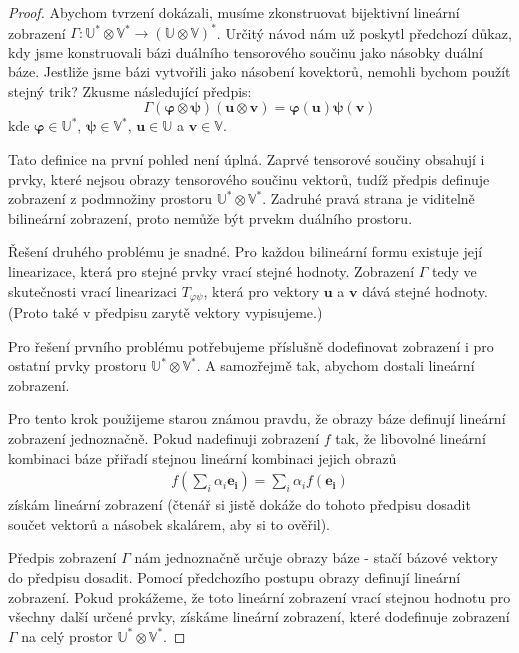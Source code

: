 \documentclass[a5paper,12pt]{amsbook}
\theoremstyle{definition}
\newcommand{\myvec}[1]{\bm{#1}}
\newcommand{\myspace}[1]{\mathbb{#1}}
\begin{document}
\begin{proof}
Abychom tvrzení dokázali, musíme zkonstruovat bijektivní lineární zobrazení
$\Gamma: \myspace{U^*}\otimes\myspace{V^*}\rightarrow(\myspace{U}\otimes\myspace{V})^*$. Určitý
návod nám už poskytl předchozí důkaz, kdy jsme konstruovali bázi duálního tensorového součinu
jako násobky duální báze. Jestliže jsme bázi vytvořili jako násobení kovektorů, nemohli bychom
použít stejný trik? Zkusme následující předpis:
\begin{equation*}
\Gamma(\myvec{\varphi}\otimes\myvec{\psi})(\myvec{u}\otimes\myvec{v}) 
  = \myvec{\varphi}(\myvec{u})\myvec{\psi}(\myvec{v})
\end{equation*}
kde $\myvec{\varphi}\in\myspace{U^*}$, $\myvec{\psi}\in\myspace{V^*}$, $\myvec{u}\in\myspace{U}$
a $\myvec{v}\in\myspace{V}$.

Tato definice na první pohled není úplná. Zaprvé tensorové součiny obsahují i prvky,
které nejsou obrazy tensorového součinu vektorů, tudíž předpis definuje zobrazení z podmnožiny
prostoru $\myspace{U^*}\otimes\myspace{V^*}$. Zadruhé pravá strana je viditelně bilineární
zobrazení, proto nemůže být prvekm duálního prostoru.

Řešení druhého problému je snadné. Pro každou bilineární formu existuje její linearizace,
která pro stejné prvky vrací stejné hodnoty. Zobrazení $\Gamma$ tedy ve skutečnosti vrací
linearizaci $T_{\varphi\psi}$, která pro vektory $\myvec{u}$ a $\myvec{v}$ dává stejné
hodnoty. (Proto také v předpisu zarytě vektory vypisujeme.)

Pro řešení prvního problému potřebujeme příslušně dodefinovat zobrazení i pro ostatní prvky
prostoru $\myspace{U^*}\otimes\myspace{V^*}$. A samozřejmě tak, abychom dostali lineární
zobrazení.

Pro tento krok použijeme starou známou pravdu, že obrazy báze definují lineární zobrazení
jednoznačně. Pokud nadefinuji zobrazení $f$ tak, že libovolné lineární kombinaci báze
přiřadí stejnou lineární kombinaci jejich obrazů
\begin{equation*}
\begin{split}
f(\sum_i\alpha_i\myvec{e_i}) = \sum_i\alpha_i f(\myvec{e_i})
\end{split}
\end{equation*}
získám lineární zobrazení (čtenář si jistě dokáže do tohoto předpisu dosadit součet vektorů
a násobek skalárem, aby si to ověřil).

Předpis zobrazení $\Gamma$ nám jednoznačně určuje obrazy báze - stačí bázové vektory do předpisu
dosadit. Pomocí předchozího postupu obrazy definují lineární zobrazení. Pokud prokážeme, že
toto lineární zobrazení vrací stejnou hodnotu pro všechny další určené prvky, získáme lineární
zobrazení, které dodefinuje zobrazení $\Gamma$ na celý prostor $\myspace{U^*}\otimes\myspace{V^*}$.


\end{proof}
\end{document}
